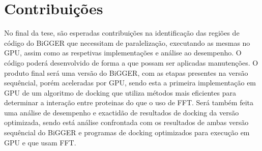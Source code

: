  \section{Contribuições}
%
%
%
No final da tese, são esperadas contribuições na identificação das regiões de código do BiGGER que necessitam de paralelização, executando as mesmas no GPU, assim como as respetivas implementações e análise ao desempenho. O código poderá desenvolvido de forma a que possam ser aplicadas manutenções. O produto final será uma versão do BiGGER, com as etapas presentes na versão sequêncial, porém aceleradas por GPU, sendo esta a primeira implementação em GPU de um algoritmo de docking que utiliza métodos mais eficientes para determinar a interação entre proteinas do que o uso de FFT.
Será também feita uma análise de desempenho e exactidão de resultados de docking da versão optimizada, sendo está análise confrontada com os resultados de ambas versão sequêncial do BiGGER e programas de docking optimizados para execução em GPU e que usam FFT.

